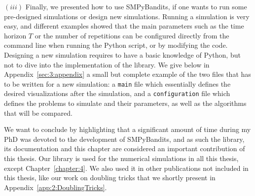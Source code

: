 {$(iii)$
Finally, we presented how to use SMPyBandits, if one wants to run some pre-designed simulations or design new simulations.
Running a simulation is very easy, and different examples showed that the main parameters such as the time horizon $T$ or the number of repetitions can be configured directly from the command line when running the Python script, or by modifying the code.
Designing a new simulation requires to have a basic knowledge of Python, but not to dive into the implementation of the library.
We give below in Appendix~\ref{sec:3:appendix} a small but complete example of the two files that has to be written for a new simulation: a \texttt{main} file which essentially defines the desired visualizations after the simulation, and a \texttt{configuration} file which defines the problems to simulate and their parameters, as well as the algorithms that will be compared.


We want to conclude by highlighting that a significant amount of time during my PhD was devoted to the development of SMPyBandits, and as such the library, its documentation and this chapter  are considered an important contribution of this thesis.
%
Our library is used for the numerical simulations in all this thesis, except Chapter~\ref{chapter:4}.
We also used it in other publications not included in this thesis, like our work on doubling tricks \cite{Besson2018DoublingTricks} that we shortly present in Appendix~\ref{app:2:DoublingTricks}.


}
